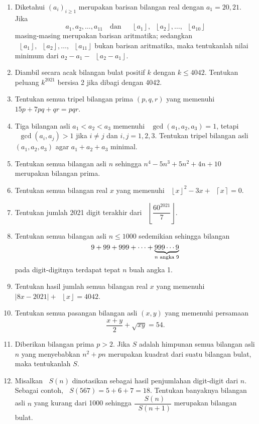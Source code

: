 \documentclass[12pt]{article}
\newcommand*\floor[1]{\mathop{}\!\left\lfloor{#1}\right\rfloor}
\newcommand*\ceil[1]{\mathop{}\!\left\lceil{#1}\right\rceil}
\newcommand*\func[2]{\mathop{}\!{#1}{\left({#2}\right)}}
\newcommand*\ubr[2]{\mathop{}\!\underbrace{#1}_{\text{$ {#2} $}}}
\begin{document}
\begin{enumerate}[leftmargin=*]
		\item Diketahui $ \left(a_{i}\right)_{i \geq 1} $ merupakan barisan bilangan real dengan $ a_{1} = 20,21 $. Jika
		\[ a_{1}, a_{2}, \dots, a_{11} \quad \mbox{dan} \quad \floor{a_{1}}, \floor{a_{2}}, \dots, \floor{a_{10}} \]
		masing-masing merupakan barisan aritmatika; sedangkan $ \floor{a_{1}}, \floor{a_{2}}, \dots, \floor{a_{11}} $ bukan barisan aritmatika, maka tentukanlah nilai minimum dari $ a_{2} - a_{1} - \floor{a_{2} - a_{1}} $.
		\item Diambil secara acak bilangan bulat positif $ k $ dengan $ k \leq 4042 $. Tentukan peluang $ k^{2021} $ bersisa 2 jika dibagi dengan 4042.
		\item Tentukan semua tripel bilangan prima $ \left(p, q, r\right) $ yang memenuhi $ 15p + 7pq + qr = pqr $.
		\item Tiga bilangan asli $ a_{1} < a_{2} < a_{3} $ memenuhi $ \func{\gcd}{a_{1}, a_{2}, a_{3}} = 1 $, tetapi $ \func{\gcd}{a_{i}, a_{j}} > 1 $ jika $ i \ne j $ dan $ i, j = 1, 2, 3 $. Tentukan tripel bilangan asli $ \left(a_{1}, a_{2}, a_{3}\right) $ agar $ a_{1} + a_{2} + a_{3} $ minimal.
		\item Tentukan semua bilangan asli $ n $ sehingga $ n^{4} - 5n^{3} + 5n^{2} + 4n + 10 $ merupakan bilangan prima.
		\item Tentukan semua bilangan real $ x $ yang memenuhi $ \floor{x}^{2} - 3x + \ceil{x} = 0 $.
		\item Tentukan jumlah 2021 digit terakhir dari $ \floor{\dfrac{60^{2021}}{7}} $.
		\item Tentukan semua bilangan asli $ n \leq 1000 $ sedemikian sehingga bilangan
		\[ 9 + 99 + 999 + \cdots + \ubr{999 \cdots 9}{n \mbox{ angka } 9} \]
		pada digit-digitnya terdapat tepat $ n $ buah angka 1.
		\item Tentukan hasil jumlah semua bilangan real $ x $ yang memenuhi $ \left|8x - 2021\right| + \floor{x} = 4042 $.
		\item Tentukan semua pasangan bilangan asli $ \left(x, y\right) $ yang memenuhi persamaan
		\[ \frac{x + y}{2} + \sqrt{xy} = 54. \]
		\item Diberikan bilangan prima $ p > 2 $. Jika $ S $ adalah himpunan semua bilangan asli $ n $ yang menyebabkan $ n^{2} + pn $ merupakan kuadrat dari suatu bilangan bulat, maka tentukanlah $ S $.
		\item Misalkan $ \func{S}{n} $ dinotasikan sebagai hasil penjumlahan digit-digit dari $ n $. Sebagai contoh, $ \func{S}{567} = 5 + 6 + 7 = 18 $. Tentukan banyaknya bilangan asli $ n $ yang kurang dari 1000 sehingga $ \dfrac{\func{S}{n}}{\func{S}{n + 1}} $ merupakan bilangan bulat.

\end{enumerate}
\end{document}
